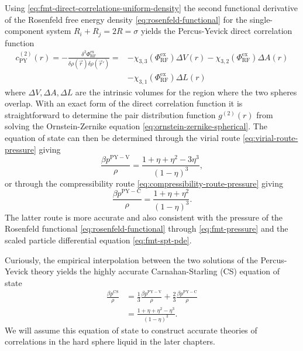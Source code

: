 \begin{tcolorbox}[title=Percus-Yevick theory in hard spheres]
  Using \eqref{eq:fmt-direct-correlations-uniform-density} the second functional derivative of the Rosenfeld free energy density \eqref{eq:rosenfeld-functional} for the single-component system $R_i + R_j = 2R = \sigma$ yields the Percus-Yevick direct correlation function \cite{RosenfeldJCP1988,WertheimPRL1963}
  \begin{align}
    c^{(2)}_\mathrm{PY}(r)
    =
    - \frac{\delta^2 \Phi_\mathrm{RF}^\mathrm{ex}}{\delta \rho(\vec{r}) \delta \rho(\vec{r}')}
    =&
    - \chi_{3,3}(\Phi_\mathrm{RF}^\mathrm{ex}) \Delta V(r)
    - \chi_{3,2}(\Phi_\mathrm{RF}^\mathrm{ex}) \Delta A(r)
    \nonumber \\ &
    - \chi_{3,1}(\Phi_\mathrm{RF}^\mathrm{ex}) \Delta L(r)
  \end{align}
  where $\Delta V, \Delta A, \Delta L$ are the intrinsic volumes for the region where the two spheres overlap.
  With an exact form of the direct correlation function it is straightforward to determine the pair distribution function $g^{(2)}(r)$ from solving the Ornstein-Zernike equation \eqref{eq:ornstein-zernike-spherical}.
  The equation of state can then be determined through the virial route \eqref{eq:virial-route-pressure} giving
  \begin{equation}
    \frac{\beta p^\mathrm{PY-V}}{\rho}
    =
    \frac{1 + \eta + \eta^2 - 3\eta^3}{(1 - \eta)^3},
  \end{equation}
  or through the compressibility route \eqref{eq:compressibility-route-pressure} giving
  \begin{equation}\label{eq:pyc-pressure}
    \frac{\beta p^\mathrm{PY-C}}{\rho}
    =
    \frac{1 + \eta + \eta^2}{(1 - \eta)^3}.
  \end{equation}
  The latter route is more accurate and also consistent with the pressure of the Rosenfeld functional \eqref{eq:rosenfeld-functional} through \eqref{eq:fmt-pressure} and the scaled particle differential equation%
  \eqref{eq:fmt-spt-pde}.

  Curiously, the empirical interpolation between the two solutions of the Percus-Yevick theory yields the highly accurate Carnahan-Starling (CS) equation of state \cite{CarnahanJCP1969}
  \begin{equation}\label{eq:cs-pressure}
    \begin{split}
      \frac{\beta p^\mathrm{CS}}{\rho}
      &=
      \frac{1}{3} \frac{\beta p^\mathrm{PY-V}}{\rho}
      + \frac{2}{3} \frac{\beta p^\mathrm{PY-C}}{\rho}
      \\ &=
      \frac{1 + \eta + \eta^2 - \eta^3}{(1-\eta)^3}.
    \end{split}
  \end{equation}
  We will assume this equation of state to construct accurate theories of correlations in the hard sphere liquid in the later chapters.
\end{tcolorbox}

